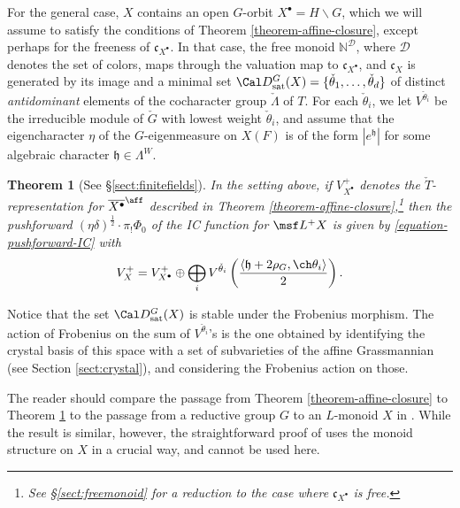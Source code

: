 \documentclass[final]{amsart}
\newtheorem{thm}[subsubsection]{Theorem}
\theoremstyle{remark}
\theoremstyle{definition}
\numberwithin{equation}{section}
\begin{document}
For the general case, $X$ contains an open $G$-orbit $X^\bullet = H\backslash G$, which we will assume to satisfy the conditions of Theorem \ref{theorem-affine-closure}, except perhaps for the freeness of $\mathfrak c_{X^\bullet}$. In that case, the free monoid $\mathbb N^{\mathcal D}$, where $\mathcal D$ denotes the set of colors, maps through the valuation map to $\mathfrak c_{X^\bullet}$, and $\mathfrak c_X$ is generated by its image and a minimal set $\Cal D^G_{\mathrm{sat}}(X)=\{\check \theta_1, \dots,\check\theta_d\}$ of distinct \emph{antidominant} elements of the cocharacter group $\check\Lambda$ of $T$. For each $\check\theta_i$, we let $V^{\check\theta_i}$ be the irreducible module of $\check G$ with lowest weight $\check\theta_i$, and assume that the eigencharacter $\eta$ of the $G$-eigenmeasure on $X(F)$ is of the form $|e^{\mathfrak h}|$ for some algebraic character $\mathfrak h \in \Lambda^W$. 

\begin{thm}[See \S \ref{sect:finitefields}]
\label{theorem-general}
In the setting above, if $V_{X^\bullet}^{+}$ denotes the $\check T$-representation for $\overline{X^\bullet}^\aff$ described in Theorem \ref{theorem-affine-closure},\footnote{See \S \ref{sect:freemonoid} for a reduction to the case where $\mathfrak c_{X^\bullet}$ is free.} then the pushforward $  (\eta\delta)^\frac{1}{2}\cdot \pi_! \Phi_0 $ of the IC function for $\msf L^+X$ is given by \eqref{equation-pushforward-IC} with 
\begin{equation}
 V^+_X = V_{X^\bullet}^{+} \oplus \bigoplus_i V^{\check\theta_i}\left(\frac{\left<\mathfrak h + 2\rho_G,\ch\theta_i\right>}{2}\right).
\end{equation}
\end{thm}

Notice that the set $\Cal D^G_{\mathrm{sat}}(X)$ is stable under the Frobenius morphism. The action of Frobenius on the sum of $V^{\check\theta_i}$'s is the one obtained by identifying the crystal basis of this space with a set of subvarieties of the affine Grassmannian (see Section \ref{sect:crystal}), and considering the Frobenius action on those.

The reader should compare the passage from Theorem \ref{theorem-affine-closure} to Theorem \ref{theorem-general} to the passage from a reductive group $G$ to an $L$-monoid $X$ in \cite[Theorem 4.1]{BNS, BNS-erratum}. While the result is similar, however, the straightforward proof of \cite{BNS} uses the monoid structure on $X$ in a crucial way, and cannot be used here. 
\end{document}
